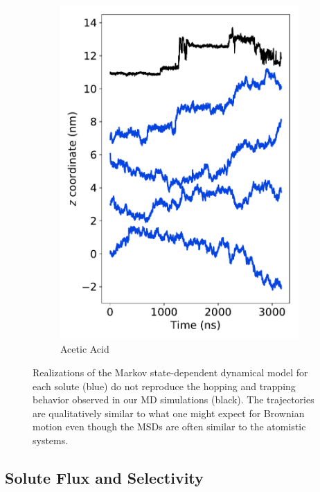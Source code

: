 \documentclass[journal=jctcce,manuscript=article]{achemso}
\begin{document}
\begin{figure}
\begin{subfigure}{0.24\textwidth}
  \includegraphics[width=\textwidth]{stacked_msddm_realizations_ACH.pdf}
  \caption{Acetic Acid}\label{fig:stacked_msddm_realizations_ACH}
  \end{subfigure}
  \caption{Realizations of the Markov state-dependent dynamical model for 
      each solute (blue) do not reproduce the hopping and trapping behavior 
      observed in our MD simulations (black). The trajectories are 
      qualitatively similar to what one might expect for Brownian motion 
      even though the MSDs are often similar to the atomistic systems.
  	  }\label{fig:msddm_eyetest}
  \end{figure}
  
  \subsection{Solute Flux and Selectivity}\label{section:mfpt}
  
\end{document}
